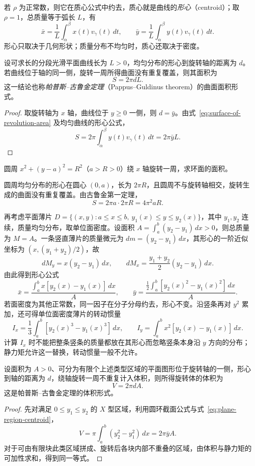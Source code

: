 若 $\rho$ 为正常数，则它在质心公式中约去，质心就是曲线的\emph{形心}（centroid）；取 $\rho=1$，总质量等于弧长 $L$，有
\[
    \bar x=\frac1L\int_\alpha^\beta x(t)v_\gamma(t)\,dt,\qquad
    \bar y=\frac1L\int_\alpha^\beta y(t)v_\gamma(t)\,dt.
\]
形心只取决于几何形状；质量分布不均匀时，质心还取决于密度。

\begin{theorem}[古鲁金第一定理]
\label{thm:guldin-surface-area}
设可求长的分段光滑平面曲线长为 $L>0$，均匀分布的形心到旋转轴的距离为 $d$。若曲线位于轴的同一侧，旋转一周所得曲面没有重复覆盖，则其面积为
\[
    S=2\pi dL.
\]
这一结论也称\emph{帕普斯--古鲁金定理}（Pappus--Guldinus theorem）的曲面面积形式。
\end{theorem}
\begin{proof}
取旋转轴为 $x$ 轴，曲线位于 $y\geq0$ 一侧，则 $d=\bar y$。由式~\eqref{eq:surface-of-revolution-area} 及均匀曲线的形心公式，
\[
    S=2\pi\int_\alpha^\beta y(t)v_\gamma(t)\,dt=2\pi\bar yL.
\]
\end{proof}

\begin{example}
\label{ex:torus-surface-area-guldin}
圆周 $x^2+(y-a)^2=R^2$（$a>R>0$）绕 $x$ 轴旋转一周，求环面的面积。
\end{example}
\begin{solve}
圆周均匀分布的形心在圆心 $(0,a)$，长为 $2\pi R$，且圆周不与旋转轴相交，旋转生成的曲面没有重复覆盖。由古鲁金第一定理，
\[
    S=2\pi a\cdot2\pi R=4\pi^2aR.
\]
\end{solve}

再考虑平面薄片 $D=\{(x,y):a\leq x\leq b,\ y_1(x)\leq y\leq y_2(x)\}$，其中 $y_1,y_2$ 连续，质量均匀分布，取单位面密度。设面积 $A=\int_a^b(y_2-y_1)\,dx>0$，则总质量为 $M=A$。一条竖直薄片的质量微元为 $dm=(y_2-y_1)\,dx$，其形心的一阶近似坐标为 $(x,(y_1+y_2)/2)$，故
\[
    dM_y=x(y_2-y_1)\,dx,\qquad
    dM_x=\frac{y_1+y_2}{2}(y_2-y_1)\,dx.
\]
由此得到形心公式
\begin{equation}
    \bar x=\frac{\int_a^bx[y_2(x)-y_1(x)]\,dx}{A},\qquad
    \bar y=\frac{\frac12\int_a^b[y_2(x)^2-y_1(x)^2]\,dx}{A}.
    \label{eq:plane-region-centroid}
\end{equation}
若面密度为其他正常数，同一因子在分子分母约去，形心不变。沿竖条再对 $y^2$ 累加，还可得单位面密度薄片的转动惯量
\[
    I_x=\frac13\int_a^b[y_2(x)^3-y_1(x)^3]\,dx,\qquad
    I_y=\int_a^bx^2[y_2(x)-y_1(x)]\,dx.
\]
计算 $I_x$ 时不能把整条竖条的质量都放在其形心而忽略竖条本身沿 $y$ 方向的分布；静力矩允许这一替换，转动惯量一般不允许。

\begin{theorem}[古鲁金第二定理]
\label{thm:guldin-volume}
设面积为 $A>0$、可分为有限个上述类型区域的平面图形位于旋转轴的一侧，形心到轴的距离为 $d$，绕轴旋转一周不重复计入体积，则所得旋转体的体积为
\[
    V=2\pi dA.
\]
这是帕普斯--古鲁金定理的体积形式。
\end{theorem}
\begin{proof}
先对满足 $0\leq y_1\leq y_2$ 的 $X$ 型区域，利用圆环截面公式与式~\eqref{eq:plane-region-centroid}，
\[
    V=\pi\int_a^b(y_2^2-y_1^2)\,dx=2\pi\bar yA.
\]
对于可由有限块此类区域拼成、旋转后各块内部不重叠的区域，由体积与静力矩的可加性求和，得到同一等式。
\end{proof}

